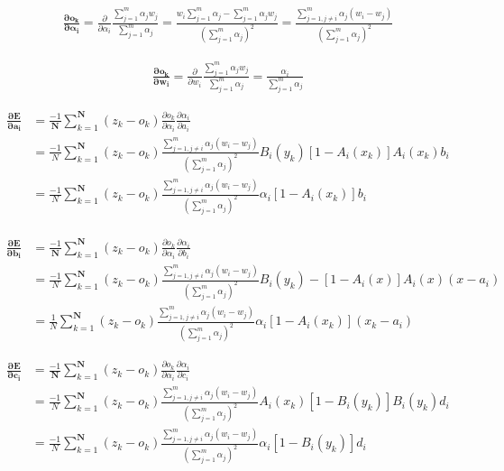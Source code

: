 \documentclass[paper=a4, fontsize=11pt]{scrartcl} %
\numberwithin{equation}{section} %
\numberwithin{figure}{section} %
\numberwithin{table}{section} %
\begin{document}
\begin{align*}
\mathbf{\frac{\partial o_k}{\partial \alpha_i}} = \frac{\partial}{\partial \alpha_i} \frac{\sum_{j=1}^{m} \alpha_j w_j}{\sum_{j=1}^{m} \alpha_j} = \frac{w_i \sum_{j = 1}^{m}\alpha_j - \sum_{j=1}^{m} \alpha_j w_j}{(\sum_{j=1}^{m}\alpha_j)^2} = \frac{\sum_{j = 1, j \neq i}^{m} \alpha_j (w_i - w_j)}{(\sum_{j=1}^{m} \alpha_j)^2 }
\end{align*}

\begin{align*}
\mathbf{\frac{\partial o_k}{\partial w_i}} = \frac{\partial}{\partial w_i} \frac{\sum_{j=1}^{m} \alpha_j w_j}{\sum_{j=1}^{m} \alpha_j} = \frac{\alpha_i}{\sum_{j=1}^{m} \alpha_j} 
\end{align*}

\begin{align*}
\mathbf{\frac{\partial E}{\partial a_i}} &= \frac{-1}{\mathbf{N}} \sum_{k=1}^{\mathbf{N}} (z_k - o_k) \frac{\partial o_k}{\partial\alpha_i} \frac{\partial \alpha_i}{\partial a_i}\\ &= \frac{-1}{N}\sum_{k=1}^{\mathbf{N}} (z_k - o_k) \frac{\sum_{j = 1, j \neq i}^{m} \alpha_j (w_i - w_j)}{(\sum_{j=1}^{m} \alpha_j)^2 } B_i(y_k) [1 - A_i(x_k)]A_i(x_k)b_i
\\ &= \frac{-1}{N}\sum_{k=1}^{\mathbf{N}} (z_k - o_k) \frac{\sum_{j = 1, j \neq i}^{m} \alpha_j (w_i - w_j)}{(\sum_{j=1}^{m} \alpha_j)^2 } \alpha_i [1 - A_i(x_k)]b_i \\
\end{align*}

\begin{align*}
\mathbf{\frac{\partial E}{\partial b_i}} &= \frac{-1}{\mathbf{N}} \sum_{k=1}^{\mathbf{N}} (z_k - o_k) \frac{\partial o_k}{\partial\alpha_i} \frac{\partial \alpha_i}{\partial b_i} 
\\ &= \frac{-1}{N}\sum_{k=1}^{\mathbf{N}} (z_k - o_k) \frac{\sum_{j = 1, j \neq i}^{m} \alpha_j (w_i - w_j)}{(\sum_{j=1}^{m} \alpha_j)^2 } B_i(y_k) -[1 -A_i(x)]A_i(x)(x - a_i)\\ &= 
\frac{1}{N}\sum_{k=1}^{\mathbf{N}} (z_k - o_k) \frac{\sum_{j = 1, j \neq i}^{m} \alpha_j (w_i - w_j)}{(\sum_{j=1}^{m} \alpha_j)^2 } \alpha_i [1 - A_i(x_k)](x_k - a_i)
\end{align*}

\begin{align*}
\mathbf{\frac{\partial E}{\partial c_i}} &= \frac{-1}{\mathbf{N}} \sum_{k=1}^{\mathbf{N}} (z_k - o_k) \frac{\partial o_k}{\partial\alpha_i} \frac{\partial \alpha_i}{\partial c_i}\\ &= \frac{-1}{N}\sum_{k=1}^{\mathbf{N}} (z_k - o_k) \frac{\sum_{j = 1, j \neq i}^{m} \alpha_j (w_i - w_j)}{(\sum_{j=1}^{m} \alpha_j)^2 } A_i(x_k) [1 - B_i(y_k)]B_i(y_k)d_i
\\ &= \frac{-1}{N}\sum_{k=1}^{\mathbf{N}} (z_k - o_k) \frac{\sum_{j = 1, j \neq i}^{m} \alpha_j (w_i - w_j)}{(\sum_{j=1}^{m} \alpha_j)^2 } \alpha_i [1 - B_i(y_k)]d_i \\
\end{align*}
\end{document}
